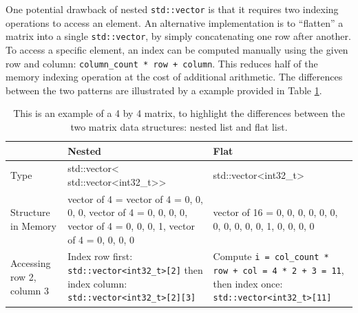 \documentclass[logo,bsc,singlespacing,parskip]{infthesis}
\newenvironment{VerbatimCompact}
  {\vspace*{-2.5mm}\VerbatimEnvironment
   \par\Verbatim}
  {\endVerbatim\vspace*{-2.4mm}}
\begin{document}
One potential drawback of nested \texttt{std::vector} is that it requires two
indexing operations to access an element. An alternative implementation is to
“flatten” a matrix into a single \texttt{std::vector}, by simply concatenating
one row after another. To access a specific element, an index can be computed
manually using the given row and column: \texttt{column\_count * row + column}.
This reduces half of the memory indexing operation at the cost of additional
arithmetic. The differences between the two patterns are illustrated by a
example provided in Table \ref{table:nested-flat}. 

\begin{table}[ht]

\begin{tabular}{%
    >{\raggedright\arraybackslash}p{2cm}%
    >{\raggedright\arraybackslash}p{6.5cm}%
    >{\raggedright\arraybackslash}p{4.5cm}}
    
    \toprule
    & Nested & Flat\\

    \midrule
    
    Type
    &
    \begin{VerbatimCompact}
std::vector<
    std::vector<int32_t>>
    \end{VerbatimCompact}
    &
    \begin{VerbatimCompact}
std::vector<int32_t>
    \end{VerbatimCompact}
    \\

Structure in Memory
    &
    \begin{VerbatimCompact}
vector of 4 = {
    vector of 4 = {0, 0, 0, 0}, 
    vector of 4 = {0, 0, 0, 0}, 
    vector of 4 = {0, 0, 0, 1}, 
    vector of 4 = {0, 0, 0, 0}
}
    \end{VerbatimCompact}
    &
    \begin{VerbatimCompact}
vector of 16 = {
    0, 0, 0, 0, 
    0, 0, 0, 0,
    0, 0, 0, 1, 
    0, 0, 0, 0
}
    \end{VerbatimCompact}
    \\

    Accessing row 2, column 3
    &
    Index row first: \texttt{std::vector<int32\_t>[2]} \linebreak
    then index column: 
        \texttt{std::vector<int32\_t>[2][3]}
    & 
    Compute \texttt{i = 
    \linebreak col\_count * row + col \linebreak = 4 * 2 + 3 =
    11}, \linebreak then index once: \texttt{std::vector<int32\_t>[11]}  \\

    \bottomrule

\end{tabular}
\caption{This is an example of a 4 by 4 matrix, to highlight the differences
between the two matrix data structures: nested list and flat list. }
\label{table:nested-flat}
\end{table}
\end{document}
